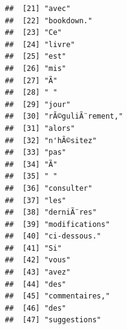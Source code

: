\documentclass[]{book}
\begin{document}
\begin{verbatim}
##  [21] "avec"                                                                                   
##  [22] "bookdown."                                                                              
##  [23] "Ce"                                                                                     
##  [24] "livre"                                                                                  
##  [25] "est"                                                                                    
##  [26] "mis"                                                                                    
##  [27] "Ã"                                                                                      
##  [28] " "                                                                                      
##  [29] "jour"                                                                                   
##  [30] "rÃ©guliÃ¨rement,"                                                                       
##  [31] "alors"                                                                                  
##  [32] "n'hÃ©sitez"                                                                             
##  [33] "pas"                                                                                    
##  [34] "Ã"                                                                                      
##  [35] " "                                                                                      
##  [36] "consulter"                                                                              
##  [37] "les"                                                                                    
##  [38] "derniÃ¨res"                                                                             
##  [39] "modifications"                                                                          
##  [40] "ci-dessous."                                                                            
##  [41] "Si"                                                                                     
##  [42] "vous"                                                                                   
##  [43] "avez"                                                                                   
##  [44] "des"                                                                                    
##  [45] "commentaires,"                                                                          
##  [46] "des"                                                                                    
##  [47] "suggestions"                                                                            

\end{verbatim}
\end{document}
